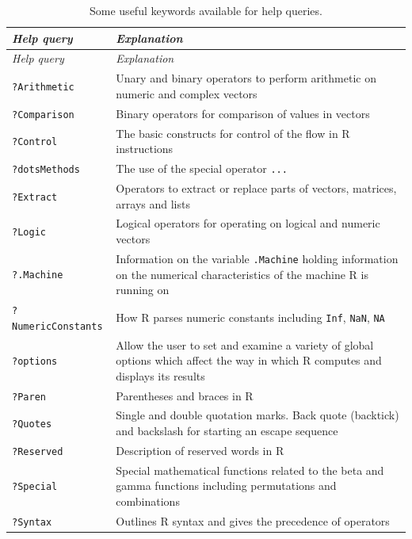 \documentclass[
]{book}
\begin{document}
\begin{longtable}[]{@{}
  >{\raggedright\arraybackslash}p{}
  >{\raggedright\arraybackslash}p{}@{}}
\caption{\label{tab:HelpQueries} Some useful keywords available for help queries.}\tabularnewline
\toprule\noalign{}
\begin{minipage}[b]{\linewidth}\raggedright
\emph{{Help query}}
\end{minipage} & \begin{minipage}[b]{\linewidth}\raggedright
\emph{{Explanation}}
\end{minipage} \\
\midrule\noalign{}
\endfirsthead
\toprule\noalign{}
\begin{minipage}[b]{\linewidth}\raggedright
\emph{{Help query}}
\end{minipage} & \begin{minipage}[b]{\linewidth}\raggedright
\emph{{Explanation}}
\end{minipage} \\
\midrule\noalign{}
\endhead
\bottomrule\noalign{}
\endlastfoot
\texttt{?Arithmetic} & Unary and binary operators to perform arithmetic on numeric and complex vectors \\
\texttt{?Comparison} & Binary operators for comparison of values in vectors \\
\texttt{?Control} & The basic constructs for control of the flow in R instructions \\
\texttt{?dotsMethods} & The use of the special operator \texttt{...} \\
\texttt{?Extract} & Operators to extract or replace parts of vectors, matrices, arrays and lists \\
\texttt{?Logic} & Logical operators for operating on logical and numeric vectors \\
\texttt{?.Machine} & Information on the variable \texttt{.Machine} holding information on the numerical characteristics of the machine R is running on \\
\texttt{?NumericConstants} & How R parses numeric constants including \texttt{Inf}, \texttt{NaN}, \texttt{NA} \\
\texttt{?options} & Allow the user to set and examine a variety of global options which affect the way in which R computes and displays its results \\
\texttt{?Paren} & Parentheses and braces in R \\
\texttt{?Quotes} & Single and double quotation marks. Back quote (backtick) and backslash for starting an escape sequence \\
\texttt{?Reserved} & Description of reserved words in R \\
\texttt{?Special} & Special mathematical functions related to the beta and gamma functions including permutations and combinations \\
\texttt{?Syntax} & Outlines R syntax and gives the precedence of operators \\
\end{longtable}
\end{document}
